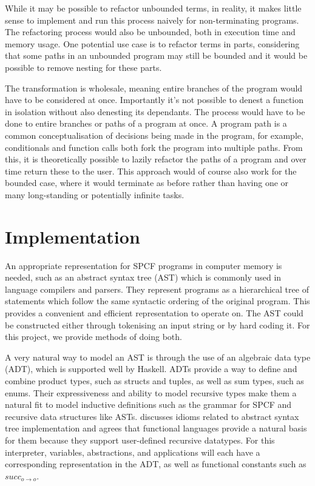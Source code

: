 \documentclass[12pt,a4paper]{report}
\theoremstyle{definition}
\theoremstyle{definition}
\theoremstyle{remark}
\begin{document}
While it may be possible to refactor unbounded terms, in reality, it makes little sense to implement and run this process naively for non-terminating programs. The refactoring process would also be unbounded, both in execution time and memory usage. One potential use case is to refactor terms in parts, considering that some paths in an unbounded program may still be bounded and it would be possible to remove nesting for these parts.

The transformation is wholesale, meaning entire branches of the program would have to be considered at once. Importantly it's not possible to denest a function in isolation without also denesting its dependants. The process would have to be done to entire branches or paths of a program at once. A program path is a common conceptualisation of decisions being made in the program, for example, conditionals and function calls both fork the program into multiple paths. From this, it is theoretically possible to lazily refactor the paths of a program and over time return these to the user. This approach would of course also work for the bounded case, where it would terminate as before rather than having one or many long-standing or potentially infinite tasks. 

\section{Implementation}\label{section: lit-review-impl}
An appropriate representation for SPCF programs in computer memory is needed, such as an abstract syntax tree (AST) which is commonly used in language compilers and parsers. They represent programs as a hierarchical tree of statements which follow the same syntactic ordering of the original program. This provides a convenient and efficient representation to operate on. The AST could be constructed either through tokenising an input string or by hard coding it. For this project, we provide methods of doing both.

A very natural way to model an AST is through the use of an algebraic data type (ADT), which is supported well by Haskell. ADTs provide a way to define and combine product types, such as structs and tuples, as well as sum types, such as enums. Their expressiveness and ability to model recursive types make them a natural fit to model inductive definitions such as the grammar for SPCF and recursive data structures like ASTs. \cite{jones_2003} discusses idioms related to abstract syntax tree implementation and agrees that functional languages provide a natural basis for them because they support user-defined recursive datatypes. For this interpreter, variables, abstractions, and applications will each have a corresponding representation in the ADT, as well as functional constants such as $succ_{o \rightarrow o}$.
\end{document}
